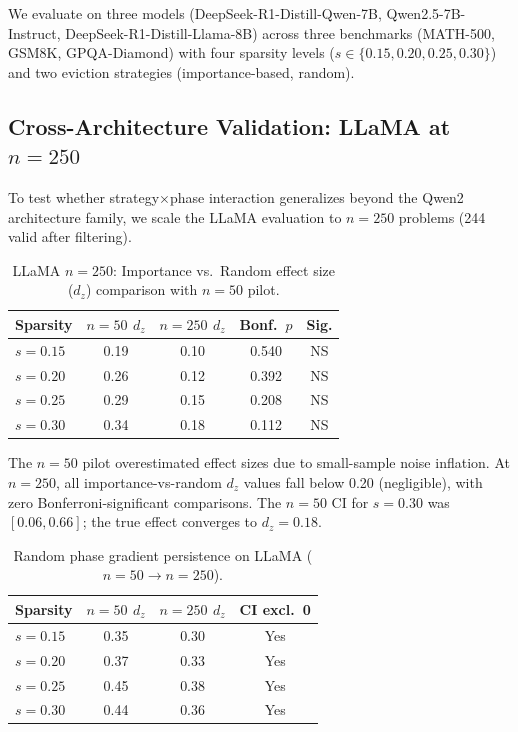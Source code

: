 \documentclass[11pt,a4paper]{article}
\begin{document}
We evaluate on three models (DeepSeek-R1-Distill-Qwen-7B, Qwen2.5-7B-Instruct, DeepSeek-R1-Distill-Llama-8B) across three benchmarks (MATH-500, GSM8K, GPQA-Diamond) with four sparsity levels ($s \in \{0.15, 0.20, 0.25, 0.30\}$) and two eviction strategies (importance-based, random).

\subsection{Cross-Architecture Validation: LLaMA at $n=250$}

To test whether strategy$\times$phase interaction generalizes beyond the Qwen2 architecture family, we scale the LLaMA evaluation to $n = 250$ problems (244 valid after filtering).

\begin{table}[h]
\centering
\small
\caption{LLaMA $n=250$: Importance vs.\ Random effect size ($d_z$) comparison with $n=50$ pilot.}
\begin{tabular}{lcccc}
\toprule
Sparsity & $n{=}50$ $d_z$ & $n{=}250$ $d_z$ & Bonf.\ $p$ & Sig. \\
\midrule
$s=0.15$ & 0.19 & 0.10 & 0.540 & NS \\
$s=0.20$ & 0.26 & 0.12 & 0.392 & NS \\
$s=0.25$ & 0.29 & 0.15 & 0.208 & NS \\
$s=0.30$ & 0.34 & 0.18 & 0.112 & NS \\
\bottomrule
\end{tabular}
\label{tab:llama_imp_rand}
\end{table}

The $n=50$ pilot overestimated effect sizes due to small-sample noise inflation. At $n=250$, all importance-vs-random $d_z$ values fall below 0.20 (negligible), with zero Bonferroni-significant comparisons. The $n=50$ CI for $s=0.30$ was $[0.06, 0.66]$; the true effect converges to $d_z = 0.18$.

\begin{table}[h]
\centering
\small
\caption{Random phase gradient persistence on LLaMA ($n=50 \to n=250$).}
\begin{tabular}{lccc}
\toprule
Sparsity & $n{=}50$ $d_z$ & $n{=}250$ $d_z$ & CI excl.\ 0 \\
\midrule
$s=0.15$ & 0.35 & 0.30 & Yes \\
$s=0.20$ & 0.37 & 0.33 & Yes \\
$s=0.25$ & 0.45 & 0.38 & Yes \\
$s=0.30$ & 0.44 & 0.36 & Yes \\
\bottomrule
\end{tabular}
\label{tab:llama_random_gradient}
\end{table}
\end{document}

